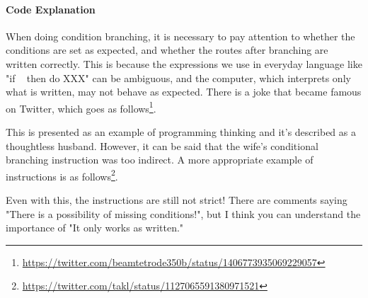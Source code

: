 \documentclass{ltjsbook}
\begin{document}

\paragraph{Code Explanation}


When doing condition branching, it is necessary to pay attention to whether the conditions are set as expected, and whether the routes after branching are written correctly. This is because the expressions we use in everyday language like "if ~ then do XXX" can be ambiguous, and the computer, which interprets only what is written, may not behave as expected. There is a joke that became famous on Twitter, which goes as follows\footnote{\url{https://twitter.com/beamtetrode350b/status/1406773935069229057}}.



This is presented as an example of programming thinking and it’s described as a thoughtless husband. However, it can be said that the wife's conditional branching instruction was too indirect. A more appropriate example of instructions is as follows\footnote{\url{https://twitter.com/takl/status/1127065591380971521}}.



Even with this, the instructions are still not strict! There are comments saying "There is a possibility of missing conditions!", but I think you can understand the importance of "It only works as written."
\end{document}
